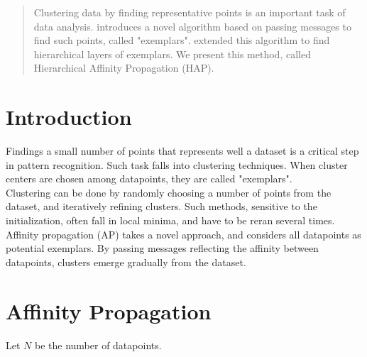 \documentclass{ipol}
\begin{document}
\begin{abstract}

Clustering data by finding representative points is an important task of data
analysis. \cite{frey07affinitypropagation} introduces a novel algorithm based
on passing messages to find such points, called "exemplars". \cite{hap}
extended this algorithm to find hierarchical layers of exemplars. We present
this method, called Hierarchical Affinity Propagation (HAP).

\end{abstract}

\begin{ipolCode}
\end{ipolCode}

\begin{ipolSupp}
\end{ipolSupp}

\section{Introduction}

Findings a small number of points that represents well a dataset is a critical
step in pattern recognition. Such task falls into clustering techniques. When
cluster centers are chosen among datapoints, they are called "exemplars". \\
Clustering can be done by randomly choosing a number of points from
the dataset, and iteratively refining clusters. Such methods, sensitive to the
initialization, often fall in local minima, and have to be reran several
times.\\
Affinity propagation (AP) takes a novel approach, and considers all datapoints
as potential exemplars. By passing messages reflecting the affinity between
datapoints, clusters emerge gradually from the dataset. \\

\section{Affinity Propagation}
Let $N$ be the number of datapoints.
\end{document}
